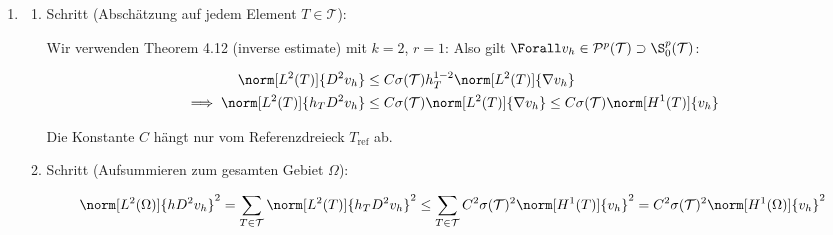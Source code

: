 \begin{solution}
\begin{enumerate}[label = \textbf{\alph*)}]
\begin{enumerate}[label = \arabic*.]
  \end{enumerate}

  \item
  
  \begin{enumerate}[label = \arabic*.]

    \item Schritt (Abschätzung auf jedem Element $T \in \mathcal{T}$):
    

    Wir verwenden Theorem 4.12 (inverse estimate) mit $k = 2$, $r = 1$:
    Also gilt $\Forall v_h \in \mathcal{P}^p(\mathcal{T}) \supset \S_0^p(\mathcal{T})$:
  
    \begin{align*}
      \norm[L^2(T)]{D^2 v_h}
      & \leq
      C \sigma(\mathcal{T}) h_T^{1-2} \norm[L^2(T)]{\nabla v_h} \\
      \implies
      \norm[L^2(T)]{h_T D^2 v_h}
      & \leq
      C \sigma(\mathcal{T}) \norm[L^2(T)]{\nabla v_h}
      \leq
      C \sigma(\mathcal{T}) \norm[H^1(T)]{v_h}
    \end{align*}
  
    Die Konstante $C$ hängt nur vom Referenzdreieck $T_\mathrm{ref}$ ab.
    
    \item Schritt (Aufsummieren zum gesamten Gebiet $\Omega$):

    \begin{align*}
      \norm[L^2(\Omega)]{h D^2 v_h}^2
      =
      \sum_{T \in \mathcal{T}}
      \norm[L^2(T)]{h_T D^2 v_h}^2
      \leq
      \sum_{T \in \mathcal{T}}
      C^2 \sigma(\mathcal{T})^2 \norm[H^1(T)]{v_h}^2
      =
      C^2 \sigma(\mathcal{T})^2 \norm[H^1(\Omega)]{v_h}^2
    \end{align*}

  \end{enumerate}

\end{enumerate}

\end{solution}

